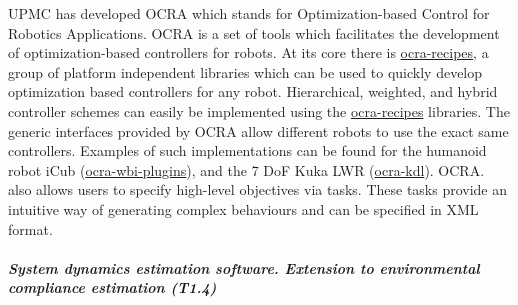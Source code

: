 
UPMC has developed OCRA which stands for Optimization-based Control for Robotics Applications. OCRA is a set of tools which facilitates the development of optimization-based controllers for robots. At its core there is \href{https://github.com/ocra-recipes/ocra-recipes}{ocra-recipes}, a group of platform independent libraries which can be used to quickly develop optimization based controllers for any robot. Hierarchical, weighted, and hybrid controller schemes can easily be implemented using the \href{https://github.com/ocra-recipes/ocra-recipes}{ocra-recipes} libraries. The generic interfaces provided by OCRA allow different robots to use the exact same controllers. Examples of such implementations can be found for the humanoid robot iCub (\href{https://github.com/ocra-recipes/ocra-wbi-plugins}{ocra-wbi-plugins}), and the 7 DoF Kuka LWR (\href{https://github.com/kuka-isir/ocra-kdl}{ocra-kdl}). OCRA. also allows users to specify high-level objectives via tasks. These tasks provide an intuitive way of generating complex behaviours and can be specified in XML format.



\subparagraph{System dynamics estimation software. Extension to
environmental compliance estimation (T1.4)}

